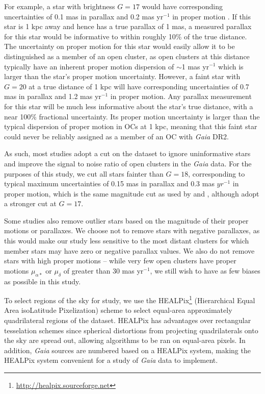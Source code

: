 For example, a star with brightness $G=17$ would have corresponding uncertainties of 0.1 mas in parallax and 0.2 mas yr$^{-1}$ in proper motion \citep{brown_gaia_2018}. If this star is 1 kpc away and hence has a true parallax of 1 mas, a measured parallax for this star would be informative to within roughly 10\% of the true distance. The uncertainty on proper motion for this star would easily allow it to be distinguished as a member of an open cluster, as open clusters at this distance typically have an inherent proper motion dispersion of $\sim$1 mas yr$^{-1}$ which is larger than the star's proper motion uncertainty. However, a faint star with $G=20$ at a true distance of 1 kpc will have corresponding uncertainties of 0.7 mas in parallax and 1.2 mas yr$^{-1}$ in proper motion. Any parallax measurement for this star will be much less informative about the star's true distance, with a near 100\% fractional uncertainty. Its proper motion uncertainty is larger than the typical dispersion of proper motion in OCs at 1 kpc, meaning that this faint star could never be reliably assigned as a member of an OC with \emph{Gaia} DR2.

As such, most studies adopt a cut on the dataset to ignore uninformative stars and improve the signal to noise ratio of open clusters in the \emph{Gaia} data. For the purposes of this study, we cut all stars fainter than $G=18$, corresponding to typical maximum uncertainties of 0.15 mas in parallax and 0.3 mas $yr^{-1}$ in proper motion, which is the same magnitude cut as used by \cite{cantat-gaudin_gaia_2018} and \cite{liu_catalog_2019}, although \cite{castro-ginard_hunting_2020} adopt a stronger cut at $G=17$.

Some studies \citep[such as][]{castro-ginard_hunting_2020, liu_catalog_2019} also remove outlier stars based on the magnitude of their proper motions or parallaxes. We choose not to remove stars with negative parallaxes, as this would make our study less sensitive to the most distant clusters for which member stars may have zero or negative parallax values. We also do not remove stars with high proper motions -- while very few open clusters have proper motions $\mu_{\alpha*}$ or $\mu_\delta$ of greater than 30 mas yr$^{-1}$, we still wish to have as few biases as possible in this study.

To select regions of the sky for study, we use the HEALPix\footnote{\href{http://healpix.sourceforge.net}{http://healpix.sourceforge.net}} (Hierarchical Equal Area isoLatitude Pixelization) scheme \citep{gorski_healpix:_2005} to select equal-area approximately quadrilateral regions of the \emph{} dataset. HEALPix has advantages over rectangular tesselation schemes \citep[such as those used in][]{castro-ginard_hunting_2020} since spherical distortions from projecting quadrilaterals onto the sky are spread out, allowing algorithms to be ran on equal-area pixels. In addition, \emph{Gaia} sources are numbered based on a HEALPix system, making the HEALPix system convenient for a study of \emph{Gaia} data to implement.

